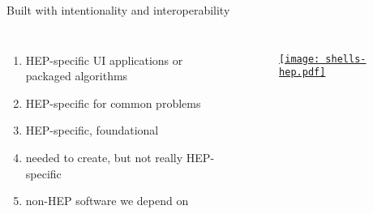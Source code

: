 \begin{frame}{Built with intentionality and interoperability}
  \begin{columns}
    \begin{enumerate}\setlength{\itemsep}{0.5 cm}
      \item HEP-specific UI applications or packaged algorithms
      \item HEP-specific for common problems
      \item HEP-specific, foundational
      \item needed to create, but not really HEP-specific
      \item non-HEP software we depend on
    \end{enumerate}
%
    \begin{figure}
        \begin{center}
            \href{https://indico.cern.ch/event/1140031/}{\texttt{[image: shells-hep.pdf]}}
        \end{center}
    \end{figure}
  \end{columns}
\end{frame}
